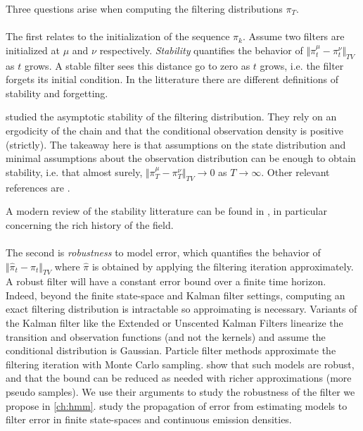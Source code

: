 Three questions arise when computing the filtering distributions $\pi_T$.

\paragraph{} The first relates to the initialization of the sequence $\pi_k$. Assume two filters are initialized at $\mu$ and $\nu$ respectively. \emph{Stability} quantifies the behavior of $\Vert \pi_t^\mu - \pi_t^\nu \Vert_{TV}$ as $t$ grows. A stable filter sees this distance go to zero as $t$ grows, i.e. the filter forgets its initial condition. In the litterature there are different definitions of stability and forgetting.

\cite{ocone} studied the asymptotic stability of the filtering distribution. They rely on an ergodicity of the chain and that the conditional observation density is positive (strictly). The takeaway here is that assumptions on the state distribution and minimal assumptions about the observation distribution can be enough to obtain stability, i.e. that almost surely, $\Vert \pi_T^\mu - \pi^\nu_T\Vert_{TV} \to 0$ as $T\to\infty$. Other relevant references are \cite{atar,chigansky,mcdonald}.

A modern review of the stability litterature can be found in \cite{kimphd}, in particular concerning the rich history of the field.

\paragraph{} The second is \emph{robustness} to model error, which quantifies the behavior of $\Vert \hat\pi_t - \pi_t\Vert_{TV}$ where $\hat \pi$ is obtained by applying the filtering iteration approximately. A robust filter will have a constant error bound over a finite time horizon. Indeed, beyond the finite state-space and Kalman filter settings, computing an exact filtering distribution is intractable so approimating is necessary. Variants of the Kalman filter like the Extended or Unscented Kalman Filters \cite{ekf,ukf} linearize the transition and observation functions (and not the kernels) and assume the conditional distribution is Gaussian\cite{sarkka}. Particle filter methods approximate the filtering iteration with Monte Carlo sampling\cite{pf,smc}. \cite{oudjane,legland} show that such models are robust, and that the bound can be reduced as needed with richer approximations (more pseudo samples).
We use their arguments to study the robustness of the filter we propose in \cref{ch:hmm}.
\cite{castro,mitrophanov} study the propagation of error from estimating models to filter error in finite state-spaces and continuous emission densities.



